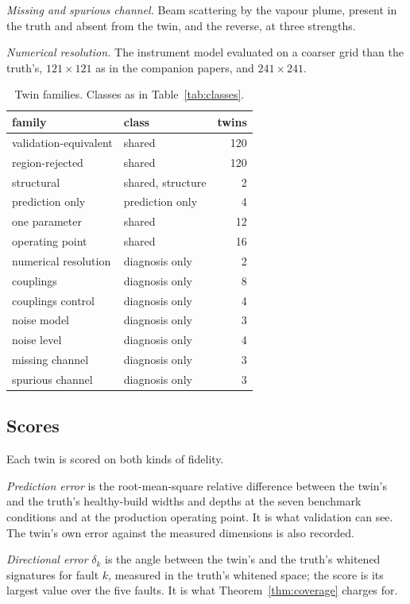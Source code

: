 \documentclass[preprint,12pt]{elsarticle}
\begin{document}
\emph{Missing and spurious channel.} Beam scattering by the vapour plume,
present in the truth and absent from the twin, and the reverse, at three
strengths.

\emph{Numerical resolution.} The instrument model evaluated on a coarser grid
than the truth's, $121\times121$ as in the companion papers, and
$241\times241$.

\begin{table}[t]
\centering
\caption{Twin families. Classes as in Table~\ref{tab:classes}.}
\label{tab:families}
\small
\begin{tabular}{@{}llr@{}}
\toprule
family & class & twins \\
\midrule
validation-equivalent & shared & 120 \\
region-rejected & shared & 120 \\
structural & shared, structure & 2 \\
prediction only & prediction only & 4 \\
one parameter & shared & 12 \\
operating point & shared & 16 \\
numerical resolution & diagnosis only & 2 \\
couplings & diagnosis only & 8 \\
couplings control & diagnosis only & 4 \\
noise model & diagnosis only & 3 \\
noise level & diagnosis only & 4 \\
missing channel & diagnosis only & 3 \\
spurious channel & diagnosis only & 3 \\
\bottomrule
\end{tabular}
\end{table}

\subsection{Scores}

Each twin is scored on both kinds of fidelity.

\emph{Prediction error} is the root-mean-square relative difference between the
twin's and the truth's healthy-build widths and depths at the seven benchmark
conditions and at the production operating point. It is what validation can
see. The twin's own error against the measured dimensions is also recorded.

\emph{Directional error} $\delta_k$ is the angle between the twin's and the
truth's whitened signatures for fault $k$, measured in the truth's whitened
space; the score is its largest value over the five faults. It is what
Theorem~\ref{thm:coverage} charges for.
\end{document}
